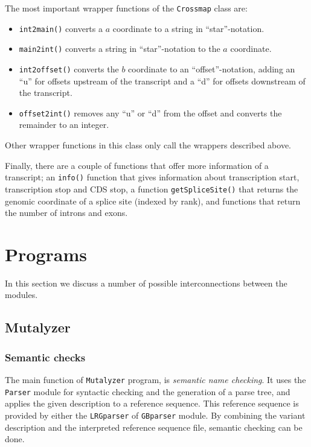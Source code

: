 \documentclass{article}
\begin{document}
The most important wrapper functions of the \texttt{Crossmap} class are:
\begin{itemize}
\item \texttt{int2main()} converts a $a$ coordinate to a string in
      ``star''-notation.
\item \texttt{main2int()} converts a string in ``star''-notation to the $a$ 
      coordinate.
\item \texttt{int2offset()} converts the $b$ coordinate to an
      ``offset''-notation, adding an ``u'' for offsets upstream of the
      transcript and a ``d'' for offsets downstream of the transcript.
\item \texttt{offset2int()} removes any ``u'' or ``d'' from the offset and
      converts the remainder to an integer.
\end{itemize}

Other wrapper functions in this class only call the wrappers described above.

Finally, there are a couple of functions that offer more information of a 
transcript; an \texttt{info()} function that gives information about
transcription start, transcription stop and CDS stop, a function
\texttt{getSpliceSite()} that returns the genomic coordinate of a splice site
(indexed by rank), and functions that return the number of introns and exons.

\newpage

\section{Programs} \label{sec:programs}
In this section we discuss a number of possible interconnections between the
modules.

\subsection{Mutalyzer} \label{subsec:mutalyzer}

\subsubsection{Semantic checks}
The main function of \texttt{Mutalyzer} program, is \emph{semantic name
checking}. It uses the \texttt{Parser} module for syntactic checking and the
generation of a parse tree, and applies the given description to a reference 
sequence. This reference sequence is provided by either the \texttt{LRGparser}
of \texttt{GBparser} module. By combining the variant description and the
interpreted reference sequence file, semantic checking can be done.
\end{document}
